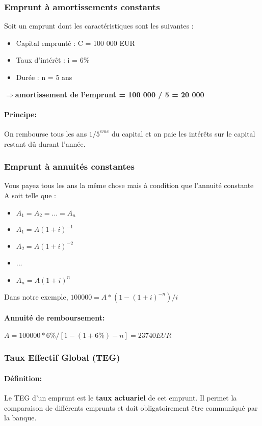 \documentclass{article}
\begin{document}
\subsubsection{Emprunt à amortissements constants}
Soit un emprunt dont les caractéristiques sont les suivantes :

\begin{itemize}
	\item Capital emprunté : C = 100 000 EUR
	\item Taux d'intér\^et : i = 6\%
	\item Durée : n = 5 ans\\
\end{itemize}


$\Rightarrow$\textbf{amortissement de l'emprunt = 100 000 / 5 = 20 000}


\paragraph{Principe:} On rembourse tous les ans $1/5^{eme}$ du capital et on paie les intér\^ets sur le capital restant d\^u durant l'année.

\subsubsection{Emprunt à annuités constantes}
Vous payez tous les ans la m\^eme chose mais à condition que l'annuité constante A soit telle que :
\begin{itemize}
	\item $A_{1} = A_{2} = ... = A_{n}$
	\item $A_{1} = A(1+i)^{-1}$
	\item $A_{2} = A(1+i)^{-2}$
	\item ...
	\item $A_{n} = A(1+i)^{n}$\\
\end{itemize}

Dans notre exemple, $100 000 = A*(1-(1+i)^{-n})/i$\\
\paragraph{Annuité de remboursement:} $A = 100 000 * 6\% / [1-(1+6\%)-n] = 23 740 EUR$\\

\subsubsection{Taux Effectif Global (TEG)}
\paragraph{Définition:} Le TEG d'un emprunt est le \textbf{taux actuariel} de cet emprunt. Il permet la comparaison de différents emprunts et doit obligatoirement être communiqué par la banque.
\end{document}

